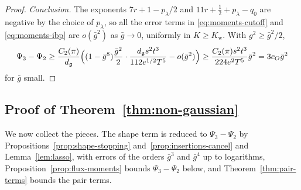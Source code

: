 \documentclass[11pt]{preprint}
\numberwithin{equation}{section}
\theoremstyle{definition}
\theoremstyle{remark}
\theoremstyle{plain}
\begin{document}
\begin{proof}
\emph{Conclusion.} The exponents $7r + 1 - p_\lambda/2$ and $11r + \frac12 + p_\lambda - q_0$ are negative by the choice of $p_\lambda$, so all the error terms in \eqref{eq:moments-cutoff} and \eqref{eq:moments-ibp} are $o(\bar g^2)$ as $\bar g \to 0$, uniformly in $K \geq K_{\mathrm w}$. With $g^2 \geq \bar g^2/2$,
\begin{equation}\label{eq:moments-conclusion}
    \Psi_3 - \Psi_2 \geq \frac{C_2(\pi)}{d_{\mathfrak g}}\Bigl((1 - \bar g^8)\frac{\bar g^2}{2}\cdot\frac{d_{\mathfrak g}s^2t^3}{112e^{1/2}T^5} - o(\bar g^2)\Bigr) \geq \frac{C_2(\pi)s^2t^3}{224e^2T^5}\bar g^2 = 3c_O\bar g^2
\end{equation}
for $\bar g$ small.
\end{proof}

\subsection{Proof of Theorem~\ref{thm:non-gaussian}}\label{sec:non-gaussianity-proof}

We now collect the pieces. The shape term is reduced to $\Psi_3 - \Psi_2$ by Propositions~\ref{prop:shape-stopping} and~\ref{prop:insertions-cancel} and Lemma~\ref{lem:lasso}, with errors of the orders $\bar g^3$ and $\bar g^4$ up to logarithms, Proposition~\ref{prop:flux-moments} bounds $\Psi_3 - \Psi_2$ below, and Theorem~\ref{thm:pair-terms} bounds the pair terms.
\end{document}
